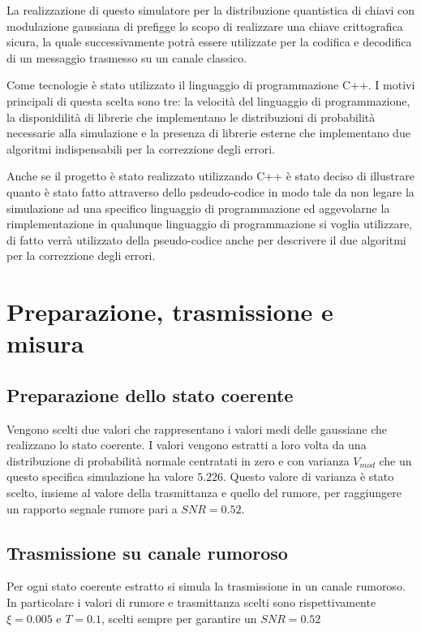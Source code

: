 La realizzazione di questo simulatore per la distribuzione quantistica di chiavi con modulazione gaussiana di prefigge lo scopo di realizzare una chiave crittografica sicura, la quale successivamente potr\`a essere utilizzate per la codifica e decodifica di un messaggio trasmesso su un canale classico. 

Come tecnologie \`e stato utilizzato il linguaggio di programmazione C++. I motivi principali di questa scelta sono tre: la velocit\`a del linguaggio di programmazione, la disponidilit\`a di librerie che implementano le distribuzioni di probabilit\`a necessarie alla simulazione e la presenza di librerie esterne che implementano due algoritmi indispensabili per la correzzione degli errori.

Anche se il progetto \`e stato realizzato utilizzando C++ \`e stato deciso di illustrare quanto \`e stato fatto attraverso dello psdeudo-codice in modo tale da non legare la simulazione ad una specifico linguaggio di programmazione ed aggevolarne la rimplementazione in qualunque linguaggio di programmazione si voglia utilizzare, di fatto verr\`a utilizzato della pseudo-codice anche per descrivere il due algoritmi per la correzzione degli errori.

\section{Preparazione, trasmissione e misura}

\subsection{Preparazione dello stato coerente}
Vengono scelti due valori che rappresentano i valori medi delle gaussiane che realizzano lo stato coerente. I valori vengono estratti a loro volta da una distribuzione di probabilit\`a normale centratati in zero e con varianza $V_{mod}$ che un questo specifica simulazione ha valore $5.226$. Questo valore di varianza \`e stato scelto, insieme al valore della trasmittanza e quello del rumore, per raggiungere un rapporto segnale rumore pari a $SNR=0.52$. 
\subsection{Trasmissione su canale rumoroso}
Per ogni stato coerente estratto si simula la trasmissione in un canale rumoroso. In particolare i valori di rumore e trasmittanza scelti sono rispettivamente $\xi = 0.005$ e $T = 0.1$, scelti sempre per garantire un $SNR = 0.52$
